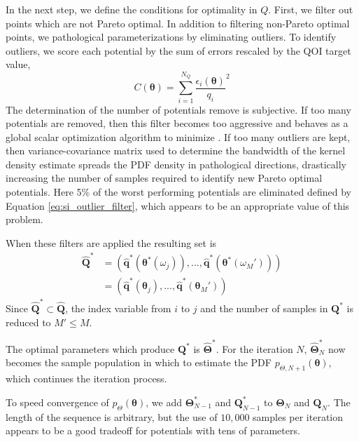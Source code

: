 In the next step, we define the conditions for optimality in $Q$.
First, we filter out points which are not Pareto optimal.  In addition to filtering non-Pareto optimal points, we pathological parameterizations by eliminating outliers.  To identify outliers, we score each potential by the sum of errors rescaled by the QOI target value,
\begin{equation}
  \label{eq:si_outlier_filter}
  C(\bm{\theta}) = \sum_{i=1}^{N_Q}\frac{\epsilon_i(\bm{\theta})}{q_i}^2
\end{equation}
The determination of the number of potentials remove is subjective.  If too many potentials are removed, then this filter becomes too aggressive and behaves as a global scalar optimization algorithm to minimize \label{eq:si_outlier_filter}.  If too many outliers are kept, then variance-covariance matrix used to determine the bandwidth of the kernel density estimate spreads the PDF density in pathological directions, drastically increasing the number of samples required to identify new Pareto optimal potentials.  Here 5\% of the worst performing potentials are eliminated defined by Equation \ref{eq:si_outlier_filter}, which appears to be an appropriate value of this problem.

When these filters are applied the resulting set is
\begin{subequations}
  \begin{align}
     \hat{\bm{Q}}^*
       &= (\hat{\bm{q}}^*(\bm{\theta}^*(\omega_j)),
           ...,
           \hat{\bm{q}}^*(\bm{\theta}^*(\omega_M'))
          )
      \label{eq:si_qoistar_seq_1} \\
       &= (\hat{\bm{q}}^*(\bm{\theta}_j),
           ...,
           \hat{\bm{q}}^*(\bm{\theta}_M')
          )
      \label{eq:si_qoistar_seq_2}
  \end{align}
\end{subequations}
Since $\hat{\bm{Q}}^* \subset \hat{\bm{Q}}$, the index variable from $i$ to $j$ and the number of samples in $\bm{Q}^*$ is reduced to $M' \leq M$.

The optimal parameters which produce $\bm{Q}^*$ is $\hat{\bm{\Theta}}^*$.  For the iteration $N$, $\hat{\bm{\Theta}}_{N}^*$ now becomes the sample population in which to estimate the PDF $p_{\Theta,N+1}(\bm{\theta})$, which continues the iteration process.

To speed convergence of $p_{\Theta}(\bm{\theta})$, we add $\bm{\Theta}_{N-1}^*$ and $\bm{Q}_{N-1}^*$ to $\bm{\Theta}_{N}$ and $\bm{Q}_{N}$.  The length of the sequence is arbitrary, but the use of $10,000$ samples per iteration appears to be a good tradeoff for potentials with tens of parameters.

